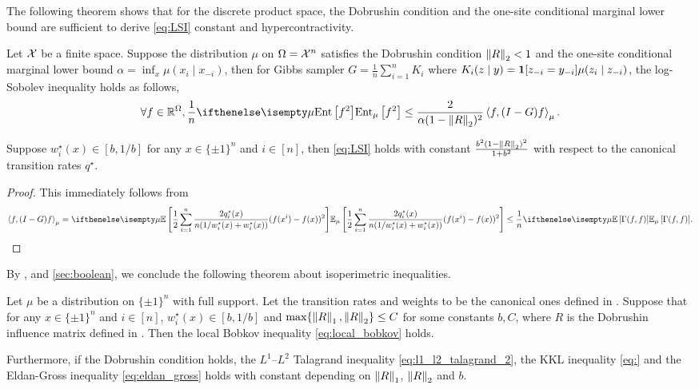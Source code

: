 The following theorem shows that for the discrete product space, the Dobrushin condition and the one-site conditional marginal lower bound are sufficient to derive \ref{eq:LSI} constant and hypercontractivity. 
\begin{theorem}\label{thm:marton_Dobrushin_to_LSI}
Let $\mathcal{X}$ be a finite space.
Suppose the distribution $\mu$ on $\Omega = \mathcal{X}^n$ satisfies the Dobrushin condition $\left\lVert R \right\rVert_2 < 1$ and the one-site conditional marginal lower bound $\alpha = \inf_x \mu(x_i\mid x_{-i})$, then for Gibbs sampler $G = \frac 1 n\sum_{i=1}^n K_i$ where $K_i(z\mid y) = \boldsymbol{1}[z_{-i}=y_{-i}]\mu(z_i\mid z_{-i})$, the log-Sobolev inequality holds as follows,
$$
    \forall f\in \R^\Omega, \frac 1n\Ent[\mu]{f^2} \leq \frac{2}{\alpha(1-\norm{R}_2)^2} \inner{f}{(I-G)f}_{\mu} .
$$
\end{theorem}
\begin{corollary}\label{cor:Dobrushin_to_LSI}
    Suppose $w_i^\star(x)\in [b,1/b]$ for any $x\in \{\pm 1\}^n$ and $i\in[n]$, then \ref{eq:LSI} holds with constant $\frac{b^2(1 - \left\lVert R \right\rVert_2)^2}{1+b^2}$ with respect to the canonical transition rates $q^\star$.
\end{corollary}
\begin{proof}
    This immediately follows from
    \[
        \inner{f}{(I-G)f}_{\mu} = \E[\mu]{\frac 12\sum_{i=1}^n \frac{2q_i^\star(x)}{n(1/w_i^\star(x)+w_i^\star(x))}(f(x^i)-f(x))^2}
        \leq \frac 1n\E[\mu]{\Gamma(f,f)} . \qedhere
    \]
\end{proof}
By ,  and \cref{sec:boolean}, we conclude the following theorem about isoperimetric inequalities.
\begin{theorem}\label{thm:Dobrushin_to_isoperimetric}
    Let $\mu$ be a distribution on $\{\pm 1\}^n$ with full support.
    Let the transition rates and weights to be the canonical ones defined in .
    Suppose that for any $x\in \{\pm 1\}^n$ and $i\in[n]$, $w_i^\star(x)\in [b,1/b]$ and $\max\{\left\lVert R \right\rVert_1,\left\lVert R \right\rVert_2\}\leq C$ for some constants $b,C$, where $R$ is the Dobrushin influence matrix defined in .
    Then the local Bobkov inequality \eqref{eq:local_bobkov} holds.

    Furthermore, if the Dobrushin condition holds, the $L^1$--$L^2$ Talagrand inequality \eqref{eq:l1_l2_talagrand_2}, the KKL inequality \eqref{eq:} and the Eldan-Gross inequality \eqref{eq:eldan_gross} holds with constant depending on $\left\lVert R \right\rVert_1$, $\left\lVert R \right\rVert_2$ and $b$.
\end{theorem}
